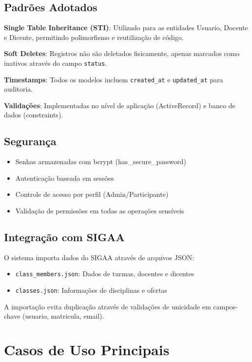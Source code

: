 \documentclass[a4paper,12pt]{article}
\begin{document}
\subsection{Padrões Adotados}

\textbf{Single Table Inheritance (STI)}: Utilizado para as entidades Usuario, Docente e Dicente, permitindo polimorfismo e reutilização de código.

\textbf{Soft Deletes}: Registros não são deletados fisicamente, apenas marcados como inativos através do campo \texttt{status}.

\textbf{Timestamps}: Todos os modelos incluem \texttt{created\_at} e \texttt{updated\_at} para auditoria.

\textbf{Validações}: Implementadas no nível de aplicação (ActiveRecord) e banco de dados (constraints).

\subsection{Segurança}
\begin{itemize}
    \item Senhas armazenadas com bcrypt (has\_secure\_password)
    \item Autenticação baseada em sessões
    \item Controle de acesso por perfil (Admin/Participante)
    \item Validação de permissões em todas as operações sensíveis
\end{itemize}

\subsection{Integração com SIGAA}

O sistema importa dados do SIGAA através de arquivos JSON:
\begin{itemize}
    \item \texttt{class\_members.json}: Dados de turmas, docentes e dicentes
    \item \texttt{classes.json}: Informações de disciplinas e ofertas
\end{itemize}

A importação evita duplicação através de validações de unicidade em campos-chave (usuario, matricula, email).

\section{Casos de Uso Principais}
\end{document}
